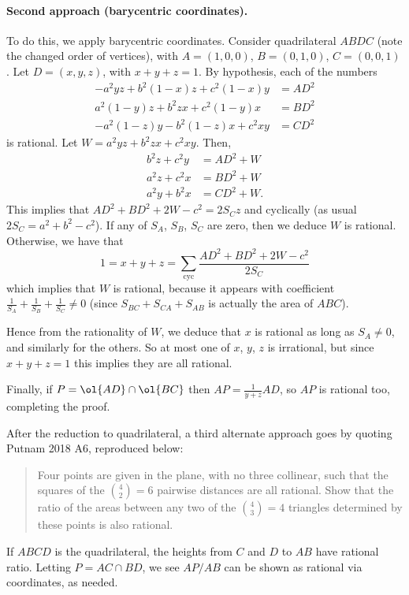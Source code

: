 \documentclass[11pt]{scrartcl}
\begin{document}
\paragraph{Second approach (barycentric coordinates).}
To do this, we apply barycentric coordinates.
Consider quadrilateral $ABDC$
(note the changed order of vertices),
with $A=(1,0,0)$, $B=(0,1,0)$, $C=(0,0,1)$.
Let $D = (x,y,z)$, with $x+y+z=1$.
By hypothesis, each of the numbers
\begin{align*}
  -a^2yz + b^2(1-x)z + c^2(1-x)y &= AD^2 \\
  a^2(1-y)z + b^2zx + c^2(1-y)x &= BD^2 \\
  -a^2(1-z)y - b^2(1-z)x + c^2xy &= CD^2
\end{align*}
is rational. Let $W = a^2yz + b^2zx + c^2xy$. Then,
\begin{align*}
  b^2z + c^2y &=  AD^2 + W \\
  a^2z + c^2x &= BD^2 + W \\
  a^2y + b^2x &= CD^2 + W.
\end{align*}
This implies that $AD^2 + BD^2 + 2W - c^2 = 2S_C z$ and cyclically
(as usual $2S_C = a^2+b^2-c^2$).
If any of $S_A$, $S_B$, $S_C$ are zero, then we deduce $W$ is rational.
Otherwise, we have that
\[ 1 = x+y+z = \sum_{\text{cyc}} \frac{AD^2 + BD^2 + 2W - c^2}{2S_C} \]
which implies that $W$ is rational,
because it appears with coefficient
$\frac{1}{S_A} + \frac{1}{S_B} + \frac{1}{S_C} \neq 0$
(since $S_{BC} + S_{CA} + S_{AB}$ is actually the area of $ABC$).

Hence from the rationality of $W$,
we deduce that $x$ is rational as long as $S_A \neq 0$,
and similarly for the others.
So at most one of $x$, $y$, $z$ is irrational,
but since $x+y+z=1$ this implies they are all rational.

Finally, if $P = \ol{AD} \cap \ol{BC}$
then $AP = \frac{1}{y+z} AD$, so $AP$ is rational too,
completing the proof.

\begin{remark*}
  After the reduction to quadrilateral,
  a third alternate approach goes by quoting Putnam 2018 A6,
  reproduced below:
  \begin{quote}
  Four points are given in the plane, with no three collinear,
  such that the squares of the $\binom42=6$ pairwise distances are all rational.
  Show that the ratio of the areas between any two of the
  $\binom43=4$ triangles determined by these points is also rational.
  \end{quote}
  If $ABCD$ is the quadrilateral,
  the heights from $C$ and $D$ to $AB$ have rational ratio.
  Letting $P = AC \cap BD$,
  we see $AP/AB$ can be shown as rational via coordinates, as needed.
\end{remark*}
\pagebreak
\end{document}
